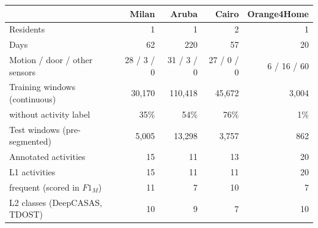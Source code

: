 \begin{tabular}{l rrrr}
\toprule
 & Milan & Aruba & Cairo & Orange4Home \\
\midrule
Residents & 1 & 1 & 2 & 1 \\
Days & 62 & 220 & 57 & 20 \\
Motion / door / other sensors & 28 / 3 / 0 & 31 / 3 / 0 & 27 / 0 / 0 & 6 / 16 / 60 \\
Training windows (continuous) & 30{,}170 & 110{,}418 & 45{,}672 & 3{,}004 \\
\quad without activity label & 35\% & 54\% & 76\% & 1\% \\
Test windows (pre-segmented) & 5{,}005 & 13{,}298 & 3{,}757 & 862 \\
\midrule
Annotated activities & 15 & 11 & 13 & 20 \\
L1 activities & 15 & 11 & 11 & 20 \\
\quad frequent (scored in $F1_M$) & 11 & 7 & 10 & 7 \\
L2 classes (DeepCASAS, TDOST) & 10 & 9 & 7 & 10 \\
\bottomrule
\end{tabular}
